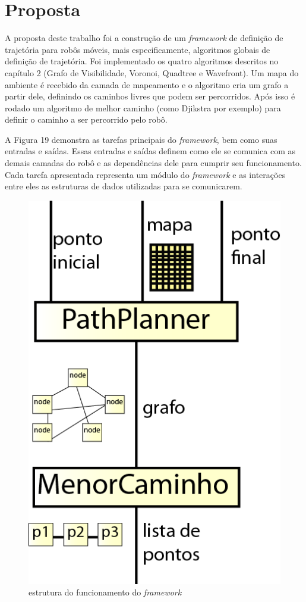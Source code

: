 \chapter[Proposta]{Proposta}

A proposta deste trabalho foi a construção de um \textit{framework} de definição de trajetória para robôs móveis, mais especificamente, algoritmos globais de definição de trajetória. Foi implementado os quatro algoritmos descritos no capítulo 2 (Grafo de Visibilidade, Voronoi, Quadtree e Wavefront). Um mapa do ambiente é recebido da camada de mapeamento e o algoritmo cria um grafo a partir dele, definindo os caminhos livres que podem ser percorridos. Após isso é rodado um algoritmo de melhor caminho (como Djikstra por exemplo) para definir o caminho a ser percorrido pelo robô. 

A Figura 19 demonstra as tarefas principais do \textit{framework}, bem como suas entradas e saídas. Essas entradas e saídas definem como ele se comunica com as demais camadas do robô e as dependências dele para cumprir seu funcionamento. Cada tarefa apresentada representa um módulo do \textit{framework} e as interações entre eles as estruturas de dados utilizadas para se comunicarem.
 
\begin{figure}[h]
	\centering
	\label{fig19}
		\includegraphics[keepaspectratio=true,scale=1.1]{figuras/framework.png}
	\caption{estrutura do funcionamento do \textit{framework}}
\end{figure} 

